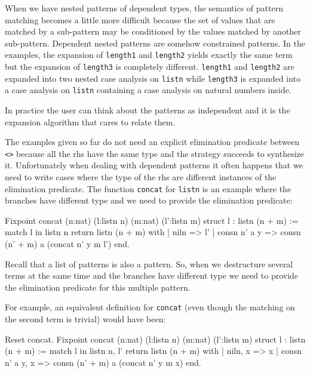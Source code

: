 When we have nested patterns of dependent types, the semantics of
pattern matching becomes a little more difficult because
the set of values that are matched by a sub-pattern may be conditioned by the
values matched by another sub-pattern. Dependent nested patterns are
somehow constrained patterns. 
In the examples, the expansion of
\texttt{length1} and \texttt{length2} yields exactly the same term
 but the
expansion of \texttt{length3} is completely different. \texttt{length1} and
\texttt{length2} are expanded into two nested case analysis on
\texttt{listn} while \texttt{length3} is expanded into a case analysis on
\texttt{listn} containing a case analysis on natural numbers inside.


In practice the user can think about the patterns as independent and
it is the expansion algorithm that cares to relate them. \\
\fi
%
%
%

The examples  given so far do not need an explicit elimination predicate
between \texttt{<>} because all the rhs have the same type and the
strategy succeeds to synthesize it.
Unfortunately when dealing with dependent patterns it often happens
that we need to write cases where the type of the rhs are 
different  instances of the elimination  predicate.
The function  \texttt{concat} for \texttt{listn}
is an example where the branches have different type
and we need to provide the elimination predicate:

\begin{coq_example}
Fixpoint concat (n:nat) (l:listn n) (m:nat) (l':listn m) {struct l} :
 listn (n + m) :=
  match l in listn n return listn (n + m) with
  | niln => l'
  | consn n' a y => consn (n' + m) a (concat n' y m l')
  end.
\end{coq_example}

Recall that a list of patterns is also a pattern. So, when
we destructure several terms at the same time and the branches have
different type  we need to provide
the elimination predicate for this multiple pattern.

For example, an equivalent definition for \texttt{concat} (even though the matching on the second term is trivial) would have
been:

\begin{coq_example}
Reset concat.
Fixpoint concat (n:nat) (l:listn n) (m:nat) (l':listn m) {struct l} :
 listn (n + m) :=
  match l in listn n, l' return listn (n + m) with
  | niln, x => x
  | consn n' a y, x => consn (n' + m) a (concat n' y m x)
  end.
\end{coq_example}

